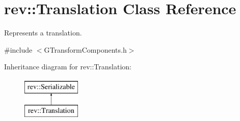 \hypertarget{structrev_1_1_translation}{}\section{rev\+::Translation Class Reference}
\label{structrev_1_1_translation}


Represents a translation.  




{\ttfamily \#include $<$G\+Transform\+Components.\+h$>$}

Inheritance diagram for rev\+::Translation\+:\begin{figure}[H]
\begin{center}
\leavevmode
\includegraphics[height=2.000000cm]{structrev_1_1_translation}
\end{center}
\end{figure}
